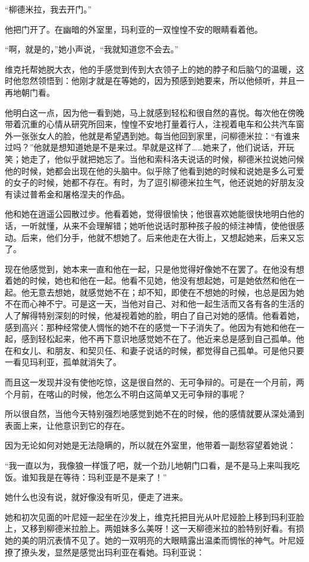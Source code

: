 “柳德米拉，我去开门。”

他把门开了。在幽暗的外室里，玛利亚的一双惶惶不安的眼睛看着他。

“啊，就是的，”她小声说，“我就知道您不会去。”

维克托帮她脱大衣，他的手感觉到传到大衣领子上的她的脖子和后脑勺的温暖，这时他忽然领悟到：他刚才就是在等她的，因为预感到她要来，所以他倾听，并且一再地朝门看。

他明白这一点，因为他一看到她，马上就感到轻松和很自然的喜悦。每次他在傍晚带着沉重的心情从研究所回来，惶惶不安地打量着行人，注视着电车和公共汽车窗外一张张女人的脸，他就是希望遇到她。每当他回到家里，问柳德米拉：“有谁来过吗？”他就是想知道她是不是来过。早就是这样了……她来了，他们说话，开玩笑；她走了，他似乎就把她忘了。当他和索科洛夫说话的时候，柳德米拉说她问候他的时候，她都会出现在他的头脑中。似乎除了他看到她的时候和说她是多么可爱的女子的时候，她都不存在。有时，为了逗引柳德米拉生气，他还说她的好朋友没有读过普希金和屠格涅夫的作品。

他和她在逍遥公园散过步。他看着她，觉得很愉快；他很喜欢她能很快地明白他的话，一听就懂，从来不会理解错；她听他说话时那种孩子般的倾注神情，使他很感动。后来，他们分手，他就不想她了。后来他走在大街上，又想起她来，后来又忘了。

现在他感觉到，她本来一直和他在一起，只是他觉得好像她不在罢了。在他没有想着她的时候，她也和他在一起。他看不见她，他没有想起她，可是她依然和他在一起。他无意去想她，就感觉她不在；却不知，即使在不想她的时候，也总是因为她不在而心神不宁。可是这一天，当他对自己、对和他一起生活而又各有各的生活的人了解得特别深刻的时候，他凝视着她的脸，明白了自己对她的感情。他看着她，感到高兴：那种经常使人惆怅的她不在的感觉一下子消失了。他因为有她和他在一起，感到轻松起来，他不再下意识地感觉她不在了。他近来总是感到自己孤单。他在和女儿、和朋友、和契贝任、和妻子说话的时候，都觉得自己孤单。可是他只要一看见玛利亚，孤单就消失了。

而且这一发现并没有使他吃惊，这是很自然的、无可争辩的。可是在一个月前，两个月前，在喀山的时候，他怎么不明白这简单又无可争辩的事呢？

所以很自然，当他今天特别强烈地感觉到她不在的时候，他的感情就要从深处涌到表面上来，让他意识到它的存在。

因为无论如何对她是无法隐瞒的，所以就在外室里，他带着一副愁容望着她说：

“我一直以为，我像狼一样饿了吧，就一个劲儿地朝门口看，是不是马上来叫我吃饭。谁知我是在等待：玛利亚是不是来了！”

她什么也没有说，就好像没有听见，便走了进来。

她和初次见面的叶尼娅一起坐在沙发上，维克托把目光从叶尼娅脸上移到玛利亚脸上，又移到柳德米拉脸上。两姐妹多么美呀！这一天柳德米拉的脸特别好看。有损她的美的阴沉表情不见了。她的一双明亮的大眼睛露出温柔而惆怅的神气。叶尼娅撩了撩头发，显然是感觉出玛利亚在看她。玛利亚说：

